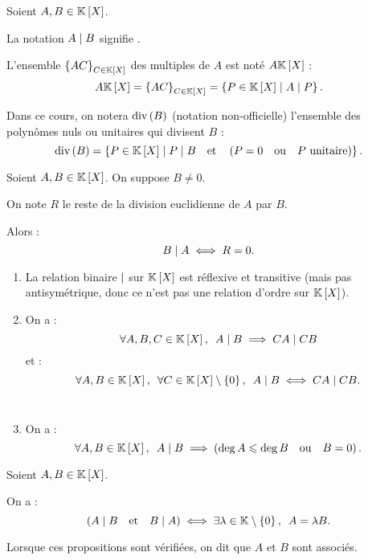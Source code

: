 \begin{nota}
Soient \(A,B\in\poly\).

La notation \(A\mid B\) signifie .

L'ensemble \(\accol{AC}_{C\in\poly}\) des multiples de \(A\) est noté \(A\poly\) : \[A\poly=\accol{AC}_{C\in\poly}=\accol{P\in\poly\tq A\divise P}.\]

Dans ce cours, on notera \(\operatorname{div}\left(B\right)\) (notation non-officielle) l'ensemble des polynômes nuls ou unitaires qui divisent \(B\) : \[\ensdiv B=\accol{P\in\poly\tq P\divise B\quad\text{et}\quad\paren{P=0\quad\text{ou}\quad P\text{ unitaire}}}.\]
\end{nota}

\begin{rem}
Soient \(A,B\in\poly\). On suppose \(B\not=0\).

On note \(R\) le reste de la division euclidienne de \(A\) par \(B\).

Alors : \[B\mid A\iff R=0.\]
\end{rem}

\begin{prop}
\begin{enumerate}
\item La relation binaire \(\mid\) sur \(\poly\) est réflexive et transitive (mais pas antisymétrique, donc ce n'est pas une relation d'ordre sur \(\poly\)). \\

\item On a : \[\quantifs{\forall A,B,C\in\poly}A\divise B\imp CA\divise CB\] et : \[\quantifs{\forall A,B\in\poly;\forall C\in\poly\excluant\accol{0}}A\divise B\ssi CA\divise CB.\] \\

\item On a : \[\quantifs{\forall A,B\in\poly}A\divise B\imp\paren{\deg A\leq\deg B\quad\text{ou}\quad B=0}.\]
\end{enumerate}
\end{prop}

\begin{defprop}
Soient \(A,B\in\poly\).

On a : \[\paren{A\divise B\quad\text{et}\quad B\divise A}\ssi\quantifs{\exists\lambda\in\K\excluant\accol{0}}A=\lambda B.\]

Lorsque ces propositions sont vérifiées, on dit que \(A\) et \(B\) sont associés.
\end{defprop}

